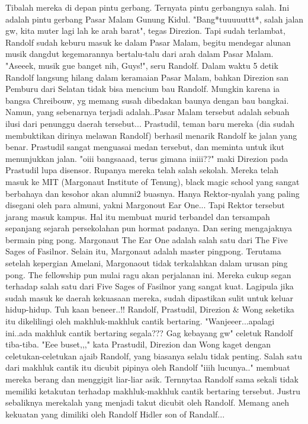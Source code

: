 \documentclass[a4paper,11pt,final]{article}
\begin{document}
Tibalah mereka di depan pintu gerbang.
Ternyata pintu gerbangnya salah. Ini adalah pintu gerbang Pasar Malam Gunung Kidul. "Bang*tuuuuuttt*, salah jalan gw, kita muter lagi lah ke arah barat", tegas Direzion.
Tapi sudah terlambat, Randolf sudah keburu masuk ke dalam Pasar Malam, begitu mendegar alunan musik dangdut kegemarannya bertalu-talu dari arah dalam Pasar Malam.
"Aseeek, musik gue banget nih, Guys!", seru Randolf.
Dalam waktu 5 detik Randolf langsung hilang dalam keramaian Pasar Malam, bahkan Direzion san Pemburu dari Selatan tidak bisa mencium bau Randolf. Mungkin karena ia bangsa Chreibouw, yg memang susah dibedakan baunya dengan bau bangkai.
Namun, yang sebenarnya terjadi adalah..Pasar Malam tersebut adalah sebuah ilusi dari penunggu daerah tersebut...
Prastudil, teman baru mereka (dia sudah membuktikan dirinya melawan Randolf) berhasil menarik Randolf ke jalan yang benar.
Prastudil sangat menguasai medan tersebut, dan meminta untuk ikut menunjukkan jalan.
"oiii bangsaaad, terus gimana iniii??" maki Direzion pada Prastudil lupa disensor.
Rupanya mereka telah salah sekolah. Mereka telah masuk ke MIT (Margonaut Institute of Tenung), black magic school yang sangat berbahaya dan kesohor akan alumni2 buasnya.
Hanya Rektor-nyalah yang paling disegani oleh para almuni, yakni Margonout Ear One...
Tapi Rektor tersebut jarang masuk kampus.
Hal itu membuat murid terbandel dan tersampah sepanjang sejarah persekolahan pun hormat padanya. Dan sering mengajaknya bermain ping pong.
Margonaut The Ear One adalah salah satu dari The Five Sages of Fasilnor.
Selain itu, Margonaut adalah master pingpong. Terutama setelah kepergian Amelani, Margonaout tidak terkalahkan dalam urusan ping pong.
The fellowship pun mulai ragu akan perjalanan ini. Mereka cukup segan terhadap salah satu dari Five Sages of Fasilnor yang sangat kuat. Lagipula jika sudah masuk ke daerah kekuasaan mereka, sudah dipastikan sulit untuk keluar hidup-hidup.
Tuh kaan beneer..!! Randolf, Prastudil, Direzion \& Wong seketika itu dikelilingi oleh makhluk-makhluk cantik bertaring.
"Wanjeeer...apalagi ini..ada makhluk cantik bertaring segala??? Gag kebayang gw" celetuk Randolf tiba-tiba. "Eee buset,,," kata Prastudil, Direzion dan Wong kaget dengan celetukan-celetukan ajaib Randolf, yang biasanya selalu tidak penting.
Salah satu dari makhluk cantik itu dicubit pipinya oleh Randolf "iiih lucunya.." membuat mereka berang dan menggigit liar-liar asik.
Ternnytaa Randolf sama sekali tidak memiliki ketakutan terhadap makhluk-makhluk cantik bertaring tersebut. Justru sebaliknya merekalah yang menjadi takut dicubit oleh Randolf. Memang aneh kekuatan yang dimiliki oleh Randolf Hidler son of Randalf...
\end{document}
